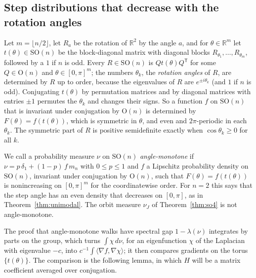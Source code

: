 \documentclass[11pt]{amsart}
\theoremstyle{definition}
\theoremstyle{remark}
\newcommand{\R}{\mathbb{R}}
\newcommand{\SO}{\mathrm{SO}}
\newcommand{\Or}{\mathrm{O}}
\newcommand{\ip}[2]{\langle #1,#2\rangle}
\newcommand{\transp}{^{\mathsf T}}
\begin{document}
\subsection{Step distributions that decrease with the rotation angles}\label{sec:monotone}
Let $m=\lfloor n/2\rfloor$, let $R_a$ be the rotation of $\R^2$ by the angle $a$, and for
$\theta\in\R^m$ let $t(\theta)\in\SO(n)$ be the block-diagonal matrix with diagonal blocks
$R_{\theta_1},\dots,R_{\theta_m}$, followed by a $1$ if $n$ is odd.  Every $R\in\SO(n)$ is
$Qt(\theta)Q\transp$ for some $Q\in\Or(n)$ and $\theta\in[0,\pi]^m$; the numbers $\theta_k$, the
\emph{rotation angles} of $R$, are determined by $R$ up to order, because the eigenvalues of $R$
are $e^{\pm i\theta_k}$ (and $1$ if $n$ is odd).  Conjugating $t(\theta)$ by permutation matrices
and by diagonal matrices with entries $\pm1$ permutes the $\theta_k$ and changes their signs.  So a
function $f$ on $\SO(n)$ that is invariant under conjugation by $\Or(n)$ is determined by
$F(\theta)=f(t(\theta))$, which is symmetric in $\theta$, and even and $2\pi$-periodic in each
$\theta_k$.  The symmetric part of $R$ is positive semidefinite exactly when $\cos\theta_k\ge0$
for all $k$.

We call a probability measure $\nu$ on $\SO(n)$ \emph{angle-monotone} if
$\nu=p\,\delta_1+(1-p)\,f\,m_n$ with $0\le p\le1$ and $f$ a Lipschitz probability density on
$\SO(n)$, invariant under conjugation by $\Or(n)$, such that $F(\theta)=f(t(\theta))$ is
nonincreasing on $[0,\pi]^m$ for the coordinatewise order.  For $n=2$ this says that the step
angle has an even density that decreases on $[0,\pi]$, as in Theorem~\ref{thm:unimodal}.  The
orbit measure $\nu_J$ of Theorem~\ref{thm:so4} is not angle-monotone.

The proof that angle-monotone walks have spectral gap $1-\lambda(\nu)$ integrates by parts on the
group, which turns $\int\chi\,d\nu$, for an eigenfunction $\chi$ of the Laplacian with eigenvalue
$-c$, into $c^{-1}\int\ip{\nabla f}{\nabla\chi}$; it then compares gradients on the torus
$\{t(\theta)\}$.  The comparison is the following lemma, in which $H$ will be a matrix coefficient
averaged over conjugation.
\end{document}
